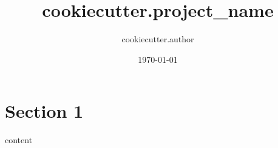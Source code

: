 \documentclass[columns = 3, fontsize = 12pt]{sheet}
\title{ {{cookiecutter.project_name}} }
\author{ {{cookiecutter.author}} }
\date{\today}
\begin{document}
\section{Section 1}
\begin{sectionbox}
	content
\end{sectionbox}
\end{document}
